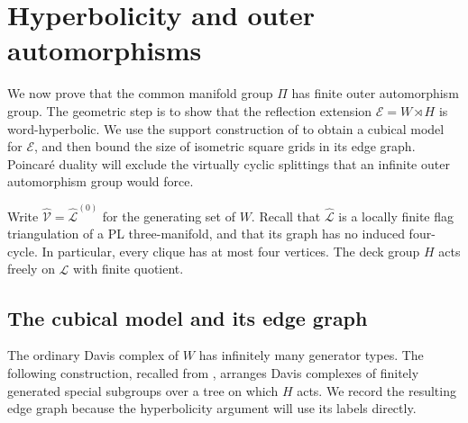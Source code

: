 \section{Hyperbolicity and outer automorphisms}
\label{hyp:section}

We now prove that the common manifold group \(\Pi\) has finite outer
automorphism group.  The geometric step is to show that the reflection
extension \(\mathcal E=W\rtimes H\) is word-hyperbolic.  We use the
support construction of \cite[Lemma~3.3 and its proof]{PD} to obtain a
cubical model for \(\mathcal E\), and then bound the size of isometric
square grids in its edge graph.  Poincar\'e duality will exclude the
virtually cyclic splittings that an infinite outer automorphism group
would force.

Write \(\widehat{\mathcal V}=\widehat{\mathcal L}^{(0)}\) for the
generating set of \(W\).  Recall that \(\widehat{\mathcal L}\) is a
locally finite flag triangulation of a PL three-manifold, and that its
graph has no induced four-cycle.  In particular, every clique has at
most four vertices.  The deck group \(H\) acts freely on
\(\widehat{\mathcal L}\) with finite quotient.

\subsection{The cubical model and its edge graph}

The ordinary Davis complex of \(W\) has infinitely many generator
types.  The following construction, recalled from
\cite[Lemma~3.3]{PD}, arranges Davis complexes of finitely generated
special subgroups over a tree on which \(H\) acts.  We record the
resulting edge graph because the hyperbolicity argument will use its
labels directly.

